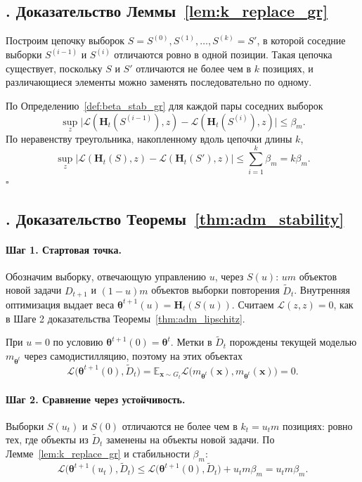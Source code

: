 \documentclass[a4paper,14pt,oneside,openany]{extarticle}
\newcommand{\bH}{\mathbf{H}}
\newcommand{\bx}{\mathbf{x}}
\newcommand{\cL}{\mathcal{L}}
\newcommand{\bbE}{\mathbb{E}}
\newcommand{\btheta}{\boldsymbol{\theta}}
\begin{document}
\subsection*{\theappthm. Доказательство Леммы~\ref{lem:k_replace_gr}}\label{app:proof_k_replace}

Построим цепочку выборок $S = S^{(0)}, S^{(1)}, \ldots, S^{(k)} = S'$, в которой соседние выборки $S^{(i-1)}$ и $S^{(i)}$ отличаются ровно в одной позиции. Такая цепочка существует, поскольку $S$ и $S'$ отличаются не более чем в $k$ позициях, и различающиеся элементы можно заменять последовательно по одному.

По Определению~\ref{def:beta_stab_gr} для каждой пары соседних выборок
\[
    \sup_z \bigl|\cL(\bH_t(S^{(i-1)}), z) - \cL(\bH_t(S^{(i)}), z)\bigr| \le \beta_m.
\]
По неравенству треугольника, накопленному вдоль цепочки длины $k$,
\[
    \sup_z \bigl|\cL(\bH_t(S), z) - \cL(\bH_t(S'), z)\bigr| \le \sum_{i=1}^k \beta_m = k \beta_m.
\]
\hfill$\square$

\subsection*{\theappthm. Доказательство Теоремы~\ref{thm:adm_stability}}\label{app:proof_adm_stability}

\paragraph{Шаг 1. Стартовая точка.} Обозначим выборку, отвечающую управлению $u$, через $S(u)$: $u m$ объектов новой задачи $D_{t+1}$ и $(1 - u) m$ объектов выборки повторения $\widetilde D_t$. Внутренняя оптимизация выдает веса $\btheta^{t+1}(u) = \bH_t(S(u))$. Считаем $\cL(z, z) = 0$, как в Шаге 2 доказательства Теоремы~\ref{thm:adm_lipschitz}.

При $u = 0$ по условию $\btheta^{t+1}(0) = \btheta^t$. Метки в $\widetilde D_t$ порождены текущей моделью $m_{\btheta^t}$ через самодистилляцию, поэтому на этих объектах
\[
    \cL\bigl(\btheta^{t+1}(0), \widetilde D_t\bigr) = \bbE_{\bx \sim G_t} \cL\bigl(m_{\btheta^t}(\bx), m_{\btheta^t}(\bx)\bigr) = 0.
\]

\paragraph{Шаг 2. Сравнение через устойчивость.} Выборки $S(u_t)$ и $S(0)$ отличаются не более чем в $k_t = u_t m$ позициях: ровно тех, где объекты из $\widetilde D_t$ заменены на объекты новой задачи. По Лемме~\ref{lem:k_replace_gr} и стабильности $\beta_m$:
\[
    \cL\bigl(\btheta^{t+1}(u_t), \widetilde D_t\bigr) \le \cL\bigl(\btheta^{t+1}(0), \widetilde D_t\bigr) + u_t m \beta_m = u_t m \beta_m.
\]
\end{document}
